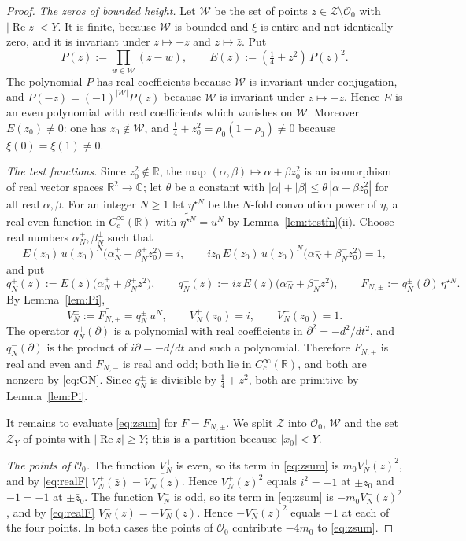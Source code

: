 \documentclass[11pt]{amsart}
\theoremstyle{remark}
\numberwithin{equation}{section}
\newcommand{\C}{\mathbb C}
\newcommand{\R}{\mathbb R}
\newcommand{\Rel}{\operatorname{Re}}
\begin{document}
\begin{proof}
\emph{The zeros of bounded height.}  Let $\mathcal W$ be the set of points
$z\in\mathcal Z\setminus\mathcal O_0$ with $|\Rel z|<Y$.  It is finite,
because $\mathcal W$ is bounded and $\xi$ is entire and not identically
zero, and it is invariant under
$z\mapsto-z$ and $z\mapsto\bar z$.  Put
\[
  P(z):=\prod_{w\in\mathcal W}(z-w),\qquad E(z):=(\tfrac14+z^2)\,P(z)^2 .
\]
The polynomial $P$ has real coefficients because $\mathcal W$ is invariant
under conjugation, and $P(-z)=(-1)^{|\mathcal W|}P(z)$ because $\mathcal W$
is invariant under $z\mapsto-z$.  Hence $E$ is an even polynomial with real
coefficients which vanishes on $\mathcal W$.  Moreover $E(z_0)\ne0$: one has
$z_0\notin\mathcal W$, and $\tfrac14+z_0^2=\rho_0(1-\rho_0)\ne0$ because
$\xi(0)=\xi(1)\ne0$.

\emph{The test functions.}  Since $z_0^2\notin\R$, the map
$(\alpha,\beta)\mapsto\alpha+\beta z_0^2$ is an isomorphism of real vector
spaces $\R^2\to\C$; let $\theta$ be a constant with
$|\alpha|+|\beta|\le\theta\,|\alpha+\beta z_0^2|$ for all real
$\alpha,\beta$.  For an integer $N\ge1$ let $\eta^{\star N}$ be the $N$-fold
convolution power of $\eta$, a real even function in $C_c^\infty(\R)$ with
$\widetilde{\eta^{\star N}}=u^N$ by Lemma~\ref{lem:testfn}(ii).  Choose real
numbers $\alpha_N^\pm,\beta_N^\pm$ such that
\[
  E(z_0)\,u(z_0)^N\bigl(\alpha_N^++\beta_N^+z_0^2\bigr)=i,\qquad
  iz_0\,E(z_0)\,u(z_0)^N\bigl(\alpha_N^-+\beta_N^-z_0^2\bigr)=1,
\]
and put
\[
  q_N^+(z):=E(z)\bigl(\alpha_N^++\beta_N^+z^2\bigr),\qquad
  q_N^-(z):=iz\,E(z)\bigl(\alpha_N^-+\beta_N^-z^2\bigr),\qquad
  F_{N,\pm}:=q_N^\pm(\partial)\,\eta^{\star N}.
\]
By Lemma~\ref{lem:Pi},
\begin{equation}
\label{eq:GN}
  V_N^\pm:=\widetilde{F_{N,\pm}}=q_N^\pm\,u^N,\qquad
  V_N^+(z_0)=i,\qquad V_N^-(z_0)=1 .
\end{equation}
The operator $q_N^+(\partial)$ is a polynomial with real coefficients in
$\partial^2=-d^2/dt^2$, and $q_N^-(\partial)$ is the product of
$i\partial=-d/dt$ and such a polynomial.  Therefore $F_{N,+}$ is real and
even and $F_{N,-}$ is real and odd; both lie in $C_c^\infty(\R)$, and both
are nonzero by \eqref{eq:GN}.  Since $q_N^\pm$ is divisible by
$\tfrac14+z^2$, both are primitive by Lemma~\ref{lem:Pi}.

It remains to evaluate \eqref{eq:zsum} for $F=F_{N,\pm}$.  We split
$\mathcal Z$ into $\mathcal O_0$, $\mathcal W$ and the set $\mathcal Z_Y$ of
points with $|\Rel z|\ge Y$; this is a partition because $|x_0|<Y$.

\emph{The points of $\mathcal O_0$.}  The function $V_N^+$ is even, so its
term in \eqref{eq:zsum} is $m_0V_N^+(z)^2$, and by \eqref{eq:realF}
$V_N^+(\bar z)=\overline{V_N^+(z)}$.  Hence $V_N^+(z)^2$ equals $i^2=-1$ at
$\pm z_0$ and $\overline{-1}=-1$ at $\pm\bar z_0$.  The function $V_N^-$ is
odd, so its term in \eqref{eq:zsum} is $-m_0V_N^-(z)^2$, and by
\eqref{eq:realF} $V_N^-(\bar z)=-\overline{V_N^-(z)}$.  Hence $-V_N^-(z)^2$
equals $-1$ at each of the four points.  In both cases the points of
$\mathcal O_0$ contribute $-4m_0$ to \eqref{eq:zsum}.


\end{proof}
\end{document}
